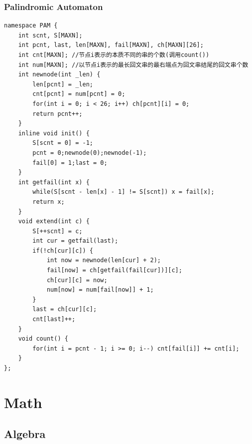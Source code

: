 \documentclass[10pt]{ctexart}
\begin{document}
{\subsubsection{Palindromic Automaton}
\begin{lstlisting}
namespace PAM {
	int scnt, S[MAXN];
	int pcnt, last, len[MAXN], fail[MAXN], ch[MAXN][26];
	int cnt[MAXN]; //节点i表示的本质不同的串的个数(调用count())
	int num[MAXN]; //以节点i表示的最长回文串的最右端点为回文串结尾的回文串个数
	int newnode(int _len) {
		len[pcnt] = _len;
		cnt[pcnt] = num[pcnt] = 0;
		for(int i = 0; i < 26; i++) ch[pcnt][i] = 0;
		return pcnt++;
	}
	inline void init() {
		S[scnt = 0] = -1;
		pcnt = 0;newnode(0);newnode(-1);
		fail[0] = 1;last = 0;
	}
	int getfail(int x) {
		while(S[scnt - len[x] - 1] != S[scnt]) x = fail[x];
		return x;
	}
	void extend(int c) {
		S[++scnt] = c;
		int cur = getfail(last);
		if(!ch[cur][c]) {
			int now = newnode(len[cur] + 2);
			fail[now] = ch[getfail(fail[cur])][c];
			ch[cur][c] = now;
			num[now] = num[fail[now]] + 1;
		}
		last = ch[cur][c];
		cnt[last]++;
	}
	void count() {
		for(int i = pcnt - 1; i >= 0; i--) cnt[fail[i]] += cnt[i];
	}
};
\end{lstlisting}





\newpage
\section{Math}
\subsection{Algebra}
}
\end{document}

